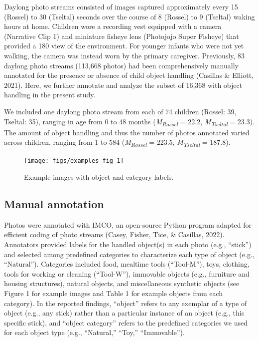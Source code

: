 \documentclass[10pt, letterpaper]{article}
\newenvironment{CodeChunk}{}{}
\begin{document}
Daylong photo streams consisted of images captured approximately every
15 (Rossel) to 30 (Tseltal) seconds over the course of 8 (Rossel) to 9
(Tseltal) waking hours at home. Children wore a recording vest equipped
with a camera (Narrative Clip 1) and miniature fisheye lens (Photojojo
Super Fisheye) that provided a 180 view of the environment. For younger
infants who were not yet walking, the camera was instead worn by the
primary caregiver. Previously, 83 daylong photo streams (113,668 photos)
had been comprehensively manually annotated for the presence or absence
of child object handling (Casillas \& Elliott, 2021). Here, we further
annotate and analyze the subset of 16,368 with object handling in the
present study.

We included one daylong photo stream from each of 74 children (Rossel:
39, Tseltal: 35), ranging in age from 0 to 48 months
(\emph{M}\textsubscript{\emph{Rossel}} = 22.2,
\emph{M}\textsubscript{\emph{Tseltal}} = 23.3). The amount of object
handling and thus the number of photos annotated varied across children,
ranging from 1 to 584 (\emph{M}\textsubscript{\emph{Rossel}} = 223.5,
\emph{M}\textsubscript{\emph{Tseltal}} = 187.8).

\begin{CodeChunk}
\begin{figure}[h]

{\centering \texttt{[image: figs/examples-fig-1]} 

}

\caption[Example images with object and category labels]{Example images with object and category labels.}\label{fig:examples-fig}
\end{figure}
\end{CodeChunk}

\hypertarget{manual-annotation}{%
\subsection{Manual annotation}\label{manual-annotation}}

Photos were annotated with IMCO, an open-source Python program adapted
for efficient coding of photo streams (Casey, Fisher, Tice, \& Casillas,
2022). Annotators provided labels for the handled object(s) in each
photo (e.g., ``stick'') and selected among predefined categories to
characterize each type of object (e.g., ``Natural''). Categories
included food, mealtime tools (``Tool-M''), toys, clothing, tools for
working or cleaning (``Tool-W''), immovable objects (e.g., furniture and
housing structures), natural objects, and miscellaneous synthetic
objects (see Figure 1 for example images and Table 1 for example objects
from each category). In the reported findings, ``object'' refers to any
exemplar of a type of object (e.g., any stick) rather than a particular
instance of an object (e.g., this specific stick), and ``object
category'' refers to the predefined categories we used for each object
type (e.g., ``Natural,'' ``Toy,'' ``Immovable'').
\end{document}
